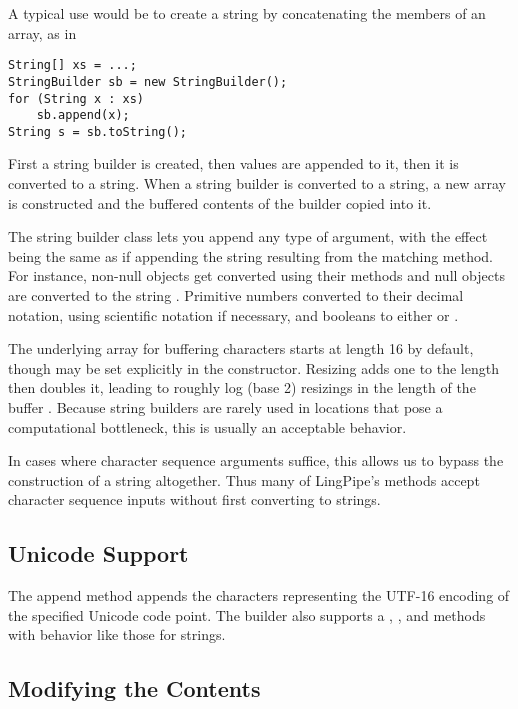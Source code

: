 A typical use would be to create a string by concatenating the members
of an array, as in
%
\begin{verbatim}
String[] xs = ...;
StringBuilder sb = new StringBuilder();
for (String x : xs)
    sb.append(x);
String s = sb.toString();
\end{verbatim}
%
First a string builder is created, then values are appended to it,
then it is converted to a string.  When a string builder is converted
to a string, a new array is constructed and the buffered contents of
the builder copied into it.

The string builder class lets you append any type of argument, with
the effect being the same as if appending the string resulting from
the matching  method.  For instance, non-null
objects get converted using their  methods and null
objects are converted to the string .  Primitive
numbers converted to their decimal notation, using scientific notation
if necessary, and booleans to either  or
.

The underlying array for buffering characters starts at length 16 by
default, though may be set explicitly in the constructor.  Resizing
adds one to the length then doubles it, leading to roughly log (base
2) resizings in the length of the buffer .  Because string builders are rarely used in locations
that pose a computational bottleneck, this is usually an acceptable
behavior.

In cases where character sequence arguments suffice, this allows us to
bypass the construction of a string altogether.  Thus many of
LingPipe's methods accept character sequence inputs without first
converting to strings.

\subsection{Unicode Support}

The append method  appends the characters
representing the UTF-16 encoding of the specified Unicode code point.
The builder also supports a , ,
and  methods with behavior like those for strings.

\subsection{Modifying the Contents}

